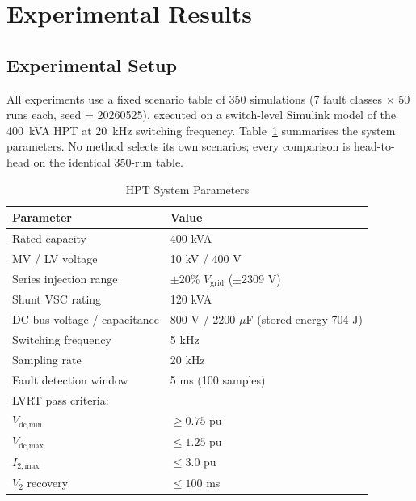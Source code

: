 
\section{Experimental Results}
\label{sec:results}

\subsection{Experimental Setup}
\label{sec:setup}

All experiments use a fixed scenario table of 350 simulations
(7 fault classes $\times$ 50 runs each, seed = 20260525),
executed on a switch-level Simulink model of the 400~kVA HPT
at 20~kHz switching frequency.
Table~\ref{tab:system} summarises the system parameters.
No method selects its own scenarios; every comparison is
head-to-head on the identical 350-run table.

\begin{table}[htbp]
\caption{HPT System Parameters}
\label{tab:system}
\centering
\begin{tabular}{ll}
\hline
Parameter & Value \\
\hline
Rated capacity & 400 kVA \\
MV / LV voltage & 10 kV / 400 V \\
Series injection range & $\pm$20\% $V_\text{grid}$ ($\pm$2309 V) \\
Shunt VSC rating & 120 kVA \\
DC bus voltage / capacitance & 800 V / 2200 $\mu$F (stored energy 704 J) \\
Switching frequency & 5 kHz \\
Sampling rate & 20 kHz \\
Fault detection window & 5 ms (100 samples) \\
\hline
\multicolumn{2}{l}{LVRT pass criteria:} \\
\quad $V_\text{dc,min}$ & $\geq 0.75$ pu \\
\quad $V_\text{dc,max}$ & $\leq 1.25$ pu \\
\quad $I_{2,\text{max}}$ & $\leq 3.0$ pu \\
\quad $V_2$ recovery & $\leq 100$ ms \\
\hline
\end{tabular}
\end{table}

